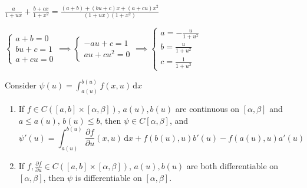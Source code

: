 $\frac{a}{1+ux}+\frac{b+cx}{1+x^2}=\frac{(a+b)+(bu+c)x+(a+cu)x^2}{(1+ux)(1+x^2)}$

$\begin{cases}
        a+b=0  \\
        bu+c=1 \\
        a+cu=0
    \end{cases}\implies\begin{cases}
        -au+c=1 \\
        au+cu^2=0
    \end{cases}\implies\begin{cases}
        a=-\frac{u}{1+u^2} \\
        b=\frac{u}{1+u^2}  \\
        c=\frac{1}{1+u^2}
    \end{cases}$

Consider $\psi(u)=\int_{a(u)}^{b(u)}f(x,u)\,\mathrm{d}x$

\begin{theorem}
    \begin{enumerate}
        \item If $f\in C\left([a,b]\times[\alpha,\beta]\right)$, $a(u),b(u)$ are continuous on $[\alpha,\beta]$ and $a\leq a(u)$, $b(u)\leq b$, then $\psi\in C[\alpha,\beta]$, and
              $$\psi'(u)=\int_{a(u)}^{b(u)}\frac{\partial f}{\partial u}(x,u)\,\mathrm{d}x+f(b(u),u)b'(u)-f(a(u),u)a'(u)$$
        \item If $f,\frac{\partial f}{\partial u}\in C\left([a,b]\times[\alpha,\beta]\right)$, $a(u),b(u)$ are both differentiable on $[\alpha,\beta]$, then $\psi$ is differentiable on $[\alpha,\beta]$.
    \end{enumerate}
\end{theorem}

